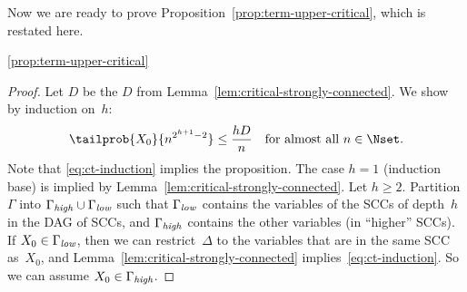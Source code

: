 \newcommand{\GammaH}{\Gamma_{\it high}}
\newcommand{\GammaL}{\Gamma_{\it low}}
\newcommand{\DeltaH}{\Delta_{\it high}}
\newcommand{\DeltaL}{\Delta_{\it low}}
Now we are ready to prove Proposition~\ref{prop:term-upper-critical}, which is restated here.
\begin{qproposition}{\ref{prop:term-upper-critical}}
 \stmtproptermuppercritical
\end{qproposition}
\begin{proof}
 Let $D$ be the $D$ from Lemma~\ref{lem:critical-strongly-connected}.
 We show by induction on~$h$:
 \begin{equation}
   \tailprob{X_0}{n^{2^{h+1}-2}} \le \frac{h D}{n} \quad \text{for almost all $n\in\Nset$.} \label{eq:ct-induction}
 \end{equation}
 Note that \eqref{eq:ct-induction} implies the proposition.
 The case $h=1$ (induction base) is implied by Lemma~\ref{lem:critical-strongly-connected}.
 Let $h \ge 2$.
 Partition $\Gamma$ into $\GammaH \cup \GammaL$ such that $\GammaL$
  contains the variables of the SCCs of depth~$h$ in the DAG of SCCs,
  and $\GammaH$ contains the other variables (in ``higher'' SCCs).
 If $X_0 \in \GammaL$, then we can restrict~$\Delta$ to the variables that are in the same SCC as~$X_0$,
  and Lemma~\ref{lem:critical-strongly-connected} implies~\eqref{eq:ct-induction}.
 So we can assume $X_0 \in \GammaH$.


\end{proof}
